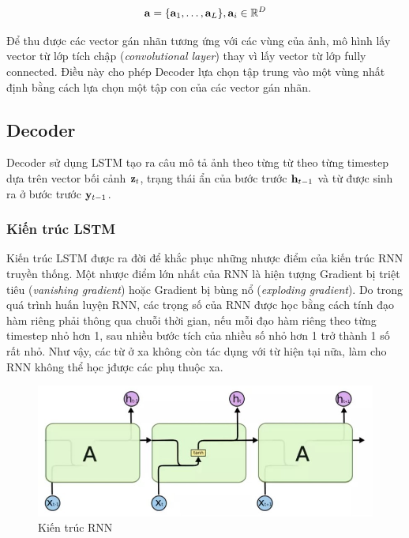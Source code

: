 \documentclass[14pt, a4paper]{article}
\numberwithin{equation}{section}
\numberwithin{algorithm}{section}
\numberwithin{figure}{section}
\numberwithin{dl}{section}
\numberwithin{md}{section}
\numberwithin{bd}{section}
\numberwithin{dn}{section}
\numberwithin{hq}{section}
\begin{document}
    \begin{equation}
        \bold{a}=\lbrace \bold{a}_1, \dots, \bold{a}_L \rbrace, \bold{a}_i \in \mathbb{R}^D
    \end{equation}

    Để thu được các vector gán nhãn tương ứng với các vùng của ảnh, mô hình lấy vector từ lớp tích chập (\textit{convolutional layer}) thay vì lấy vector từ lớp fully connected.
    Điều này cho phép Decoder lựa chọn tập trung vào một vùng nhất định bằng cách lựa chọn một tập con của các vector gán nhãn.

    \subsection{Decoder}

    Decoder sử dụng LSTM \cite{hochreiter1997long} tạo ra câu mô tả ảnh theo từng từ theo từng timestep dựa trên vector bối cảnh $\bold{z}_t$, trạng thái ẩn của bước trước $\bold{h}_{t-1}$ và từ được sinh ra ở bước trước $\bold{y}_{t-1}$.

    \subsubsection{Kiến trúc LSTM}

    Kiến trúc LSTM được ra đời để khắc phục những nhược điểm của kiến trúc RNN truyền thống.
    Một nhược điểm lớn nhất của RNN là hiện tượng Gradient bị triệt tiêu (\textit{vanishing gradient}) hoặc Gradient bị bùng nổ (\textit{exploding gradient}).
    Do trong quá trình huấn luyện RNN, các trọng số của RNN được học bằng cách tính đạo hàm riêng phải thông qua chuỗi thời gian, nếu mỗi đạo hàm riêng theo từng timestep nhỏ hơn 1, sau nhiều bước tích của nhiều số nhỏ hơn 1 trở thành 1 số rất nhỏ.
    Như vậy, các từ ở xa không còn tác dụng với từ hiện tại nữa, làm cho RNN không thể học jđược các phụ thuộc xa.


    \begin{figure}[h!] \centering

        \includegraphics[scale=0.9]{RNN_Sequence.jpg}
        \caption{Kiến trúc RNN}
    
        \label{fig:RNN_Sequence}
    \end{figure}
\end{document}
